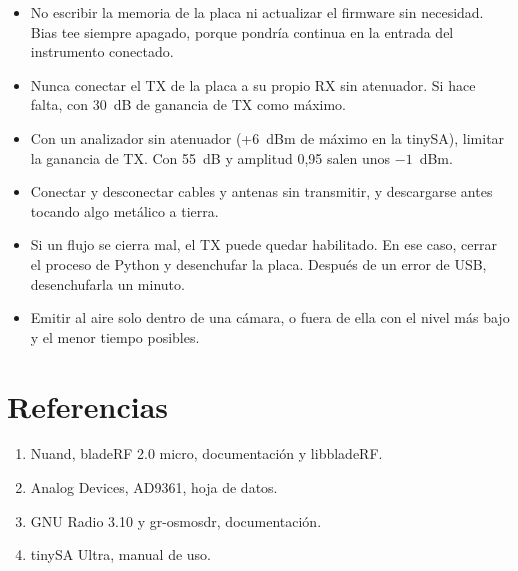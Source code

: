 \documentclass[11pt,a4paper]{article}
\begin{document}
\begin{itemize}
  \item No escribir la memoria de la placa ni actualizar el firmware sin necesidad. Bias tee siempre apagado, porque pondría continua en la entrada del instrumento conectado.
  \item Nunca conectar el TX de la placa a su propio RX sin atenuador. Si hace falta, con 30~dB de ganancia de TX como máximo.
  \item Con un analizador sin atenuador (+6~dBm de máximo en la tinySA), limitar la ganancia de TX. Con 55~dB y amplitud 0,95 salen unos $-1$~dBm.
  \item Conectar y desconectar cables y antenas sin transmitir, y descargarse antes tocando algo metálico a tierra.
  \item Si un flujo se cierra mal, el TX puede quedar habilitado. En ese caso, cerrar el proceso de Python y desenchufar la placa. Después de un error de USB, desenchufarla un minuto.
  \item Emitir al aire solo dentro de una cámara, o fuera de ella con el nivel más bajo y el menor tiempo posibles.
\end{itemize}

\section{Referencias}

\begin{enumerate}
  \item Nuand, bladeRF 2.0 micro, documentación y libbladeRF.
  \item Analog Devices, AD9361, hoja de datos.
  \item GNU Radio 3.10 y gr-osmosdr, documentación.
  \item tinySA Ultra, manual de uso.
\end{enumerate}
\end{document}
